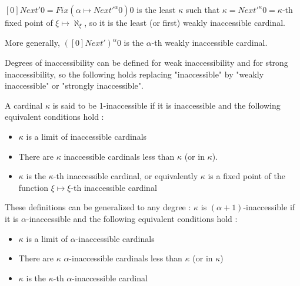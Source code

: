 \documentclass[10pt]{article}
\begin{document}
\( [0] Next' 0 = Fix (\alpha \mapsto Next'^\alpha 0) 0 \) is the least \( \kappa \) such that \( \kappa = Next'^\kappa 0 = \kappa\)-th fixed point of \( \xi \mapsto \aleph_\xi \), so it is the least (or first) weakly inaccessible cardinal. 

More generally, \( ([0] Next')^\alpha 0 \) is the \(\alpha\)-th weakly inaccessible cardinal.

\bigskip

Degrees of inaccessibility can be defined for weak inaccessibility and for strong inaccessibility, so the following holds replacing "inaccessible" by "weakly inaccessible" or "strongly inaccessible".

A cardinal \( \kappa \) is said to be 1-inaccessible if it is inaccessible and the following equivalent conditions hold :

\begin{itemize}
     \setlength{\itemsep}{1pt}
     \setlength{\parskip}{0pt}
     \setlength{\parsep}{0pt}

\item \(\kappa\) is a limit of inaccessible cardinals

\item There are \(\kappa\) inaccessible cardinals less than \( \kappa \) (or in \( \kappa \)).

\item \(\kappa\) is the \(\kappa\)-th inaccessible cardinal, or equivalently \(\kappa\) is a fixed point of the function \( \xi \mapsto \xi\)-th inaccessible cardinal

\end{itemize}

These definitions can be generalized to any degree : \( \kappa \) is \((\alpha+1)\)-inaccessible if it is \(\alpha\)-inaccessible and the following equivalent conditions hold :

\begin{itemize}
     \setlength{\itemsep}{1pt}
     \setlength{\parskip}{0pt}
     \setlength{\parsep}{0pt}

\item \(\kappa\) is a limit of \(\alpha\)-inaccessible cardinals

\item There are \(\kappa\) \(\alpha\)-inaccessible cardinals less than \(\kappa\) (or in \(\kappa\))

\item \(\kappa\) is the \(\kappa\)-th \(\alpha\)-inaccessible cardinal

\end{itemize}
\end{document}
